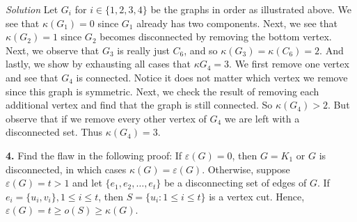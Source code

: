\documentclass{article}
\begin{document}
\textit{Solution} Let \(G_i\) for \(i \in \{1,2,3,4\} \) be the graphs in order as illustrated above. We see that \(\kappa(G_1)=0\) since \(G_1\) already has two components. Next, we see that \(\kappa(G_2)=1\) since \(G_2\) becomes disconnected by removing the bottom vertex. Next, we observe that \(G_3\) is really just \(C_6\), and so \(\kappa(G_3)=\kappa(C_6)=2\). And lastly, we show by exhausting all cases that \(\kappa  G_4=3\). We first remove one vertex and see that \(G_4\) is connected. Notice it does not matter which vertex we remove since this graph is symmetric. Next, we check the result of removing each additional vertex and find that the graph is still connected. So \(\kappa(G_4) >2\). But observe that if we remove every other vertex of \(G_4\) we are left with a disconnected set. Thus \(\kappa(G_4)=3\). 



\vspace{5mm}

\textbf{4.} Find the flaw in the following proof: If \(\varepsilon(G)=0\), then \(G=K_1\) or \(G\) is disconnected, in which cases \(\kappa(G) = \varepsilon(G)\). Otherwise, suppose \(\varepsilon(G)=t>1\) and let \(\{e_1,e_2,\ldots,e_t\}\) be a disconnecting set of edges of \(G\). If \(e_i=\{u_i,v_i\},1\leq i \leq t\), then \(S=\{u_i :1\leq i\leq t\}\) is a vertex cut. Hence, \(\varepsilon(G) = t \geq o(S) \geq \kappa(G)\).

\vspace{3mm}
\end{document}
